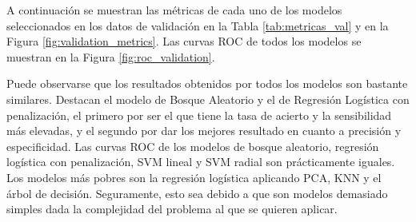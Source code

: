 \documentclass[12pt,a4paper,]{book}
\numberwithin{dummy}{section}
\theoremstyle{ocrenumbox}
\theoremstyle{blacknumex}
\theoremstyle{blacknumbox}
\theoremstyle{ocrenum}
\theoremstyle{ocrenum}
\begin{document}
A continuación se muestran las métricas de cada uno de los modelos
seleccionados en los datos de validación en la Tabla
\ref{tab:metricas_val} y en la Figura \ref{fig:validation_metrics}. Las
curvas ROC de todos los modelos se muestran en la Figura
\ref{fig:roc_validation}.

Puede observarse que los resultados obtenidos por todos los modelos son
bastante similares. Destacan el modelo de Bosque Aleatorio y el de
Regresión Logística con penalización, el primero por ser el que tiene la
tasa de acierto y la sensibilidad más elevadas, y el segundo por dar los
mejores resultado en cuanto a precisión y especificidad. Las curvas ROC
de los modelos de bosque aleatorio, regresión logística con
penalización, SVM lineal y SVM radial son prácticamente iguales. Los
modelos más pobres son la regresión logística aplicando PCA, KNN y el
árbol de decisión. Seguramente, esto sea debido a que son modelos
demasiado simples dada la complejidad del problema al que se quieren
aplicar.

\begin{table}[H]
\centering
{}
\caption[Métricas de los modelos seleccionados sobre el conjunto de validación]{Métricas de los modelos seleccionados sobre el conjunto de validación.  \it Fuente: Elaboración propia.}
\label{tab:metricas_val}
\end{table}
\end{document}
